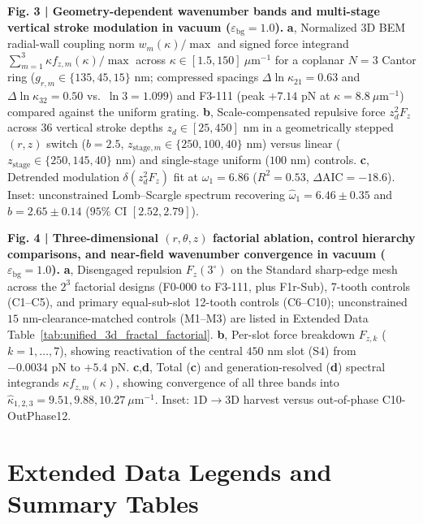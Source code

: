 \documentclass[11pt, a4paper]{article}
\begin{document}
\medskip
\noindent\textbf{Fig. 3 | Geometry-dependent wavenumber bands and multi-stage vertical stroke modulation in vacuum ($\varepsilon_{\mathrm{bg}}=1.0$).} \textbf{a}, Normalized 3D BEM radial-wall coupling norm $w_m(\kappa)/\max$ and signed force integrand $\sum_{m=1}^{3}\kappa f_{z,m}(\kappa)/\max$ across $\kappa \in [1.5, 150]\ \mu\text{m}^{-1}$ for a coplanar $N=3$ Cantor ring ($g_{r,m} \in \{135, 45, 15\}\text{ nm}$; compressed spacings $\Delta\ln\kappa_{21} = 0.63$ and $\Delta\ln\kappa_{32} = 0.50$ vs.\ $\ln 3 = 1.099$) and F3-111 (peak $+7.14\text{ pN}$ at $\kappa = 8.8\ \mu\text{m}^{-1}$) compared against the uniform grating. \textbf{b}, Scale-compensated repulsive force $z_d^2 F_z$ across $36$ vertical stroke depths $z_d \in [25, 450]\text{ nm}$ in a geometrically stepped $(r,z)$ switch ($b=2.5$, $z_{\mathrm{stage},m} \in \{250, 100, 40\}\text{ nm}$) versus linear ($z_{\mathrm{stage}} \in \{250, 145, 40\}\text{ nm}$) and single-stage uniform ($100\text{ nm}$) controls. \textbf{c}, Detrended modulation $\delta(z_d^2 F_z)$ fit at $\omega_1 = 6.86$ ($R^2 = 0.53$, $\Delta\mathrm{AIC} = -18.6$). Inset: unconstrained Lomb--Scargle spectrum recovering $\hat{\omega}_1 = 6.46 \pm 0.35$ and $\hat{b} = 2.65 \pm 0.14$ ($95\%\text{ CI }[2.52, 2.79]$).

\medskip
\noindent\textbf{Fig. 4 | Three-dimensional $(r, \theta, z)$ factorial ablation, control hierarchy comparisons, and near-field wavenumber convergence in vacuum ($\varepsilon_{\mathrm{bg}}=1.0$).} \textbf{a}, Disengaged repulsion $F_z(3^\circ)$ on the Standard sharp-edge mesh across the $2^3$ factorial designs (F0-000 to F3-111, plus F1r-Sub), 7-tooth controls (C1--C5), and primary equal-sub-slot 12-tooth controls (C6--C10); unconstrained $15\text{ nm}$-clearance-matched controls (M1--M3) are listed in Extended Data Table~\ref{tab:unified_3d_fractal_factorial}. \textbf{b}, Per-slot force breakdown $F_{z,k}$ ($k=1,\dots,7$), showing reactivation of the central $450\text{ nm}$ slot (S4) from $-0.0034\text{ pN}$ to $+5.4\text{ pN}$. \textbf{c},\textbf{d}, Total (\textbf{c}) and generation-resolved (\textbf{d}) spectral integrands $\kappa f_{z,m}(\kappa)$, showing convergence of all three bands into $\hat{\kappa}_{1,2,3} = 9.51, 9.88, 10.27\ \mu\text{m}^{-1}$. Inset: $1\mathrm{D} \to 3\mathrm{D}$ harvest versus out-of-phase C10-OutPhase12.

\clearpage
\renewcommand{\tablename}{Extended Data Table}
\setcounter{table}{0}

\section*{Extended Data Legends and Summary Tables}
\end{document}
